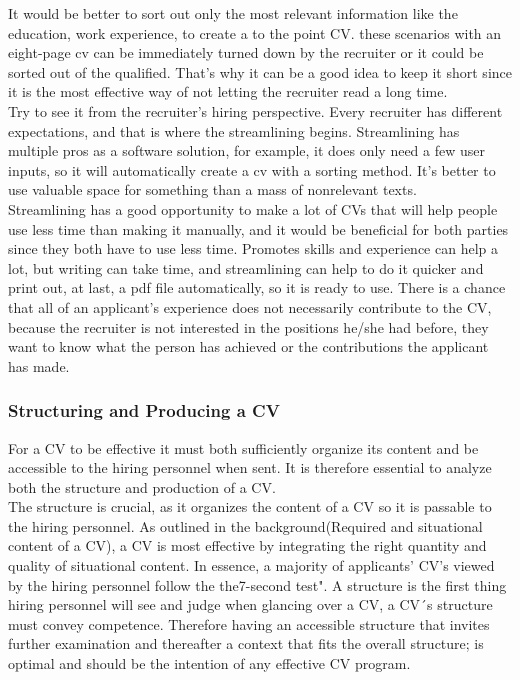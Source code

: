 It would be better to sort out only the most relevant information like the education, work experience, to create a to the point CV. 
these scenarios with an eight-page cv can be immediately turned down by the recruiter or it could be sorted out of the qualified.
That's why it can be a good idea to keep it short since it is the most effective way of not letting the recruiter read a long time. \\

Try to see it from the recruiter's hiring perspective. Every recruiter has different expectations, 
and that is where the streamlining begins. Streamlining has multiple pros as a software solution,
for example, it does only need a few user inputs, so it will automatically create a cv with a sorting method. 
It's better to use valuable space for something than a mass of nonrelevant texts. \\

Streamlining has a good opportunity to make a lot of CVs that will help people use less time than making it manually,
and it would be beneficial for both parties since they both have to use less time.
Promotes skills and experience can help a lot, but writing can take time, and streamlining can help to do it quicker 
and print out, at last, a pdf file automatically, so it is ready to use.
There is a chance that all of an applicant's experience does not necessarily contribute to the CV, 
because the recruiter is not interested in the positions he/she had before, they want to know what the person has achieved
or the contributions the applicant has made. 

\subsubsection{Structuring and Producing a CV}
For a CV to be effective it must both sufficiently organize its content and be accessible to the hiring personnel when sent.
It is therefore essential to analyze both the structure and production of a CV. \\

The structure is crucial, as it organizes the content of a CV so it is passable to the hiring personnel.
As outlined in the background(Required and situational content of a CV), a CV is most effective by integrating the right quantity and quality of situational content.
In essence, a majority of applicants' CV's viewed by the hiring personnel follow the the7-second test".
A structure is the first thing hiring personnel will see and judge when glancing over a CV, a CV´s structure must convey competence.
Therefore having an accessible structure that invites further examination and thereafter a context that fits the overall structure;
is optimal and should be the intention of any effective CV program. \\

